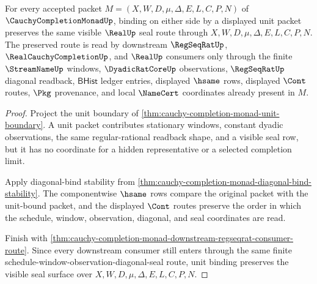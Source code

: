 \begin{theorem}
\label{thm:cauchy-completion-monad-unit-bind-visible-seal-preservation}
For every accepted packet $M=(X,W,D,\mu,\Delta,E,L,C,P,N)$ of $\CauchyCompletionMonadUp$, binding on either side by a displayed unit packet preserves the same visible $\RealUp$ seal route through $X,W,D,\mu,\Delta,E,L,C,P,N$. The preserved route is read by downstream $\RegSeqRatUp$, $\RealCauchyCompletionUp$, and $\RealUp$ consumers only through the finite $\StreamNameUp$ windows, $\DyadicRatCoreUp$ observations, $\RegSeqRatUp$ diagonal readback, $\mathsf{BHist}$ ledger entries, displayed $\hsame$ rows, displayed $\Cont$ routes, $\Pkg$ provenance, and local $\NameCert$ coordinates already present in $M$.
\end{theorem}
\begin{proof}
Project the unit boundary of \autoref{thm:cauchy-completion-monad-unit-boundary}. A unit packet contributes stationary windows, constant dyadic observations, the same regular-rational readback shape, and a visible seal row, but it has no coordinate for a hidden representative or a selected completion limit.

Apply diagonal-bind stability from \autoref{thm:cauchy-completion-monad-diagonal-bind-stability}. The componentwise $\hsame$ rows compare the original packet with the unit-bound packet, and the displayed $\Cont$ routes preserve the order in which the schedule, window, observation, diagonal, and seal coordinates are read.

Finish with \autoref{thm:cauchy-completion-monad-downstream-regseqrat-consumer-route}. Since every downstream consumer still enters through the same finite schedule-window-observation-diagonal-seal route, unit binding preserves the visible seal surface over $X,W,D,\mu,\Delta,E,L,C,P,N$.
\end{proof}

